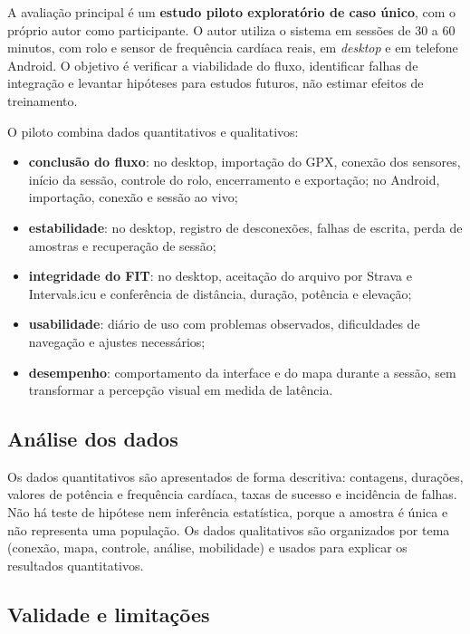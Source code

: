 A avaliação principal é um \textbf{estudo piloto exploratório de caso único},
com o próprio autor como participante. O autor utiliza o sistema em sessões de
30 a 60 minutos, com rolo e sensor de frequência cardíaca reais, em
\textit{desktop} e em telefone Android. O objetivo é verificar a viabilidade do
fluxo, identificar
falhas de integração e levantar hipóteses para estudos futuros, não estimar
efeitos de treinamento.

O piloto combina dados quantitativos e qualitativos:

\begin{itemize}
    \item \textbf{conclusão do fluxo}: no desktop, importação do GPX, conexão
        dos sensores, início da sessão, controle do rolo, encerramento e
        exportação; no Android, importação, conexão e sessão ao vivo;
    \item \textbf{estabilidade}: no desktop, registro de desconexões, falhas de
        escrita, perda de amostras e recuperação de sessão;
    \item \textbf{integridade do FIT}: no desktop, aceitação do arquivo por
        Strava e Intervals.icu e conferência de distância, duração, potência e
        elevação;
    \item \textbf{usabilidade}: diário de uso com problemas observados,
        dificuldades de navegação e ajustes necessários;
    \item \textbf{desempenho}: comportamento da interface e do mapa durante a
        sessão, sem transformar a percepção visual em medida de latência.
\end{itemize}

\subsection{Análise dos dados}
\label{sec:analise-dados}

Os dados quantitativos são apresentados de forma descritiva: contagens,
durações, valores de potência e frequência cardíaca, taxas de sucesso e
incidência de falhas. Não há teste de hipótese nem inferência estatística,
porque a amostra é única e não representa uma população. Os dados qualitativos
são organizados por tema (conexão, mapa, controle, análise, mobilidade) e
usados para explicar os resultados quantitativos.

\subsection{Validade e limitações}
\label{sec:validade}

